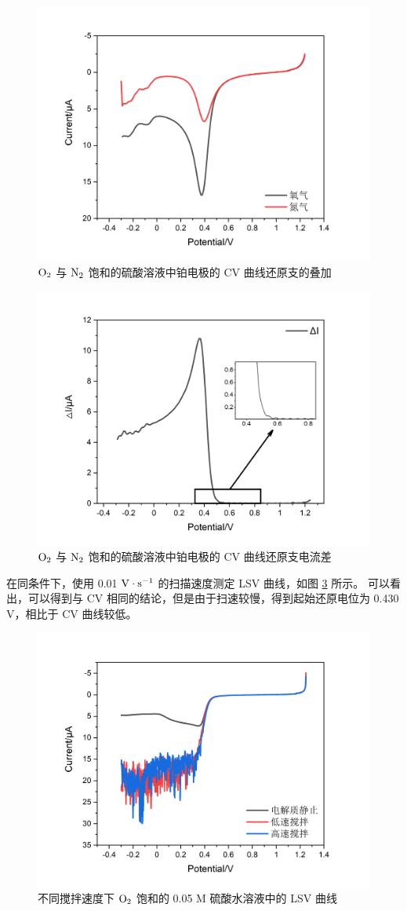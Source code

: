 \documentclass[cn,hazy,pku,12pt,normal,math=newtx,cite=super]{elegantnote}
\begin{document}
\begin{figure}[htbp]
    \centering
    \includegraphics[width = .70\textwidth]{image/Graph9.png}
    \caption{$\rm O_2$ 与 $\rm N_2$ 饱和的硫酸溶液中铂电极的 CV 曲线还原支的叠加}\label{6}
\end{figure}

\begin{figure}[htbp]
    \centering
    \includegraphics[width = .70\textwidth]{image/Graph10.png}
    \caption{$\rm O_2$ 与 $\rm N_2$ 饱和的硫酸溶液中铂电极的 CV 曲线还原支电流差}\label{7}
\end{figure}

在同条件下，使用 0.01 $\rm V \cdot s^{-1}$ 的扫描速度测定 LSV 曲线，如图 \ref{8} 所示。
可以看出，可以得到与 CV 相同的结论，但是由于扫速较慢，得到起始还原电位为 0.430 V，相比于 CV 曲线较低。


\begin{figure}[htbp]
    \centering
    \includegraphics[width = .70\textwidth]{image/Graph1.png}
    \caption{不同搅拌速度下 $\rm O_2$ 饱和的 0.05 M 硫酸水溶液中的 LSV 曲线}\label{8}
\end{figure}
\end{document}
